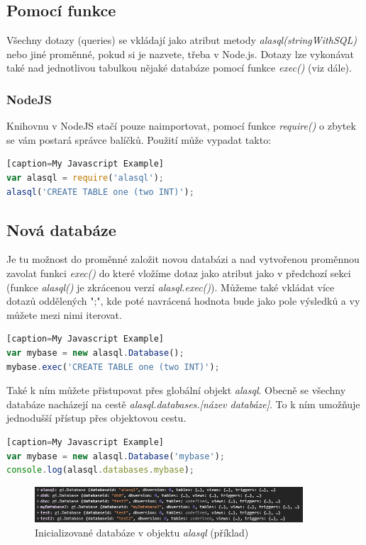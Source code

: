 \documentclass[a4, titlepage]{article}
\begin{document}
\subsection{Pomocí funkce}
Všechny dotazy (queries) se vkládají jako atribut metody \textit{alasql(stringWithSQL)} nebo jiné proměnné, pokud si je nazvete, třeba v Node.js. Dotazy lze vykonávat také nad jednotlivou tabulkou nějaké databáze pomocí funkce \textit{exec()} (viz dále).

\subsubsection{NodeJS}
Knihovnu v NodeJS stačí pouze naimportovat, pomocí funkce \textit{require()} o zbytek se vám postará správce balíčků. Použití může vypadat takto:
\begin{lstlisting}[language=JavaScript][caption=My Javascript Example]
var alasql = require('alasql');
alasql('CREATE TABLE one (two INT)');
\end{lstlisting}

\subsection{Nová databáze}
Je tu možnost do proměnné založit novou databázi a nad vytvořenou proměnnou zavolat funkci \textit{exec()} do které vložíme dotaz jako atribut jako v předchozí sekci (funkce \textit{alasql()} je zkrácenou verzí \textit{alasql.exec()}). Můžeme také vkládat více dotazů oddělených ";", kde poté navrácená hodnota bude jako pole výsledků a vy můžete mezi nimi iterovat.

\begin{lstlisting}[language=JavaScript][caption=My Javascript Example]
var mybase = new alasql.Database();
mybase.exec('CREATE TABLE one (two INT)');
\end{lstlisting}

Také k ním můžete přistupovat přes globální objekt \textit{alasql}. Obecně se všechny databáze nacházejí na cestě \textit{alasql.databases.[název databáze]}. To k ním umožňuje jednodušší přístup přes objektovou cestu.

\begin{lstlisting}[language=JavaScript][caption=My Javascript Example]
var mybase = new alasql.Database('mybase');
console.log(alasql.databases.mybase);
\end{lstlisting}

\begin{figure}[h]
    \centering
    \includegraphics[width=10cm]{databases}
    \caption{Inicializované databáze v objektu \textit{alasql} (příklad)}
\end{figure}
\end{document}
